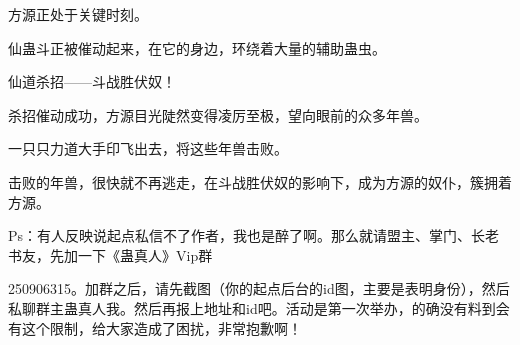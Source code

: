 \begin{this_body}
方源正处于关键时刻。

仙蛊斗正被催动起来，在它的身边，环绕着大量的辅助蛊虫。

仙道杀招——斗战胜伏奴！

杀招催动成功，方源目光陡然变得凌厉至极，望向眼前的众多年兽。

一只只力道大手印飞出去，将这些年兽击败。

击败的年兽，很快就不再逃走，在斗战胜伏奴的影响下，成为方源的奴仆，簇拥着方源。

Ps：有人反映说起点私信不了作者，我也是醉了啊。那么就请盟主、掌门、长老书友，先加一下《蛊真人》Vip群

250906315。加群之后，请先截图（你的起点后台的id图，主要是表明身份），然后私聊群主蛊真人我。然后再报上地址和id吧。活动是第一次举办，的确没有料到会有这个限制，给大家造成了困扰，非常抱歉啊！

\end{this_body}

